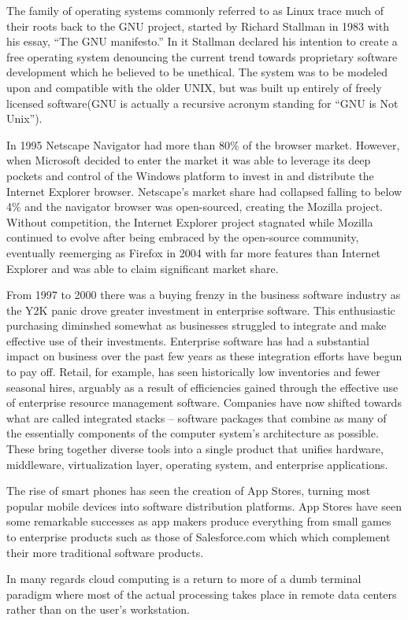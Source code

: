The family of operating systems commonly referred to as Linux trace much of their roots back to the GNU project, started by Richard Stallman in 1983 with his essay, ``The GNU manifesto.''\autocite[]{GNUManifesto}
In it Stallman declared his intention to create a free operating system denouncing the current trend towards proprietary software development which he believed to be unethical.\autocite[]{GNUManifesto}
The system was to be modeled upon and compatible with the older UNIX, but was built up entirely of freely licensed software(GNU is actually a recursive acronym standing for ``GNU is Not Unix'').\autocite[]{GNUManifesto}

In 1995 Netscape Navigator had more than 80\% of the browser market. However, when Microsoft decided to enter the market it was able to leverage its deep pockets and control of the Windows platform to invest in and distribute the Internet Explorer browser.\autocite[27]{buxmann2012software}
Netscape's market share had collapsed falling to below 4\% and the navigator browser was open-sourced, creating the Mozilla project.\autocite[27]{buxmann2012software}
Without competition, the Internet Explorer project stagnated while Mozilla continued to evolve after being embraced by the open-source community, eventually reemerging as Firefox in 2004 with far more features than Internet Explorer and was able to claim significant market share.\autocite[27]{buxmann2012software}

From 1997 to 2000 there was a buying frenzy in the business software industry as the Y2K panic drove greater investment in enterprise software.\autocite[]{AftermathOfIntegratedStack}
This enthusiastic purchasing diminshed somewhat as businesses struggled to integrate and make effective use of their investments.\autocite[]{AftermathOfIntegratedStack}
Enterprise software has had a substantial impact on business over the past few years as these integration efforts have begun to pay off. Retail, for example, has seen historically low inventories and fewer seasonal hires, arguably as a result of efficiencies gained through the effective use of enterprise resource management software. \autocite[]{AftermathOfIntegratedStack}
Companies have now shifted towards what are called integrated stacks -- software packages that combine as many of the essentially components of the computer system's architecture as possible.
These bring together diverse tools into a single product that unifies hardware, middleware, virtualization layer, operating system, and enterprise applications.\autocite[]{AftermathOfIntegratedStack}

The rise of smart phones has seen the creation of App Stores, turning most popular mobile devices into software distribution platforms.\autocite[]{TheAppEconomy}
App Stores have seen some remarkable successes as app makers produce everything from small games to enterprise products such as those of Salesforce.com which which complement their more traditional software products.\autocite[45]{TheAppEconomy}

In many regards cloud computing is a return to more of a dumb terminal paradigm where most of the actual processing takes place in remote data centers rather than on the user's workstation.\autocite[]{LargeParadigmShiftCloudComputing}
